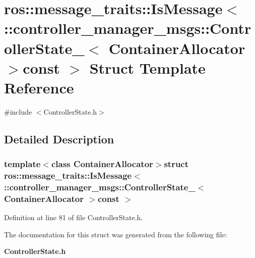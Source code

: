 \section{ros\-:\-:message\-\_\-traits\-:\-:\-Is\-Message$<$ \-:\-:controller\-\_\-manager\-\_\-msgs\-:\-:\-Controller\-State\-\_\-$<$ \-Container\-Allocator $>$const $>$ \-Struct \-Template \-Reference}
\label{structros_1_1message__traits_1_1IsMessage_3_01_1_1controller__manager__msgs_1_1ControllerState__74b6715478cd3de41d864e84fd3fb645}


{\ttfamily \#include $<$\-Controller\-State.\-h$>$}



\subsection{\-Detailed \-Description}
\subsubsection*{template$<$class Container\-Allocator$>$struct ros\-::message\-\_\-traits\-::\-Is\-Message$<$ \-::controller\-\_\-manager\-\_\-msgs\-::\-Controller\-State\-\_\-$<$ Container\-Allocator $>$const  $>$}



\-Definition at line 81 of file \-Controller\-State.\-h.



\-The documentation for this struct was generated from the following file\-:\begin{DoxyCompactItemize}
\item 
{\bf \-Controller\-State.\-h}\end{DoxyCompactItemize}
